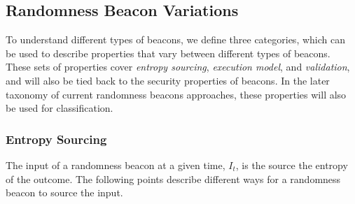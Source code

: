\subsection{Randomness Beacon Variations}
 To understand different types of beacons, we define three categories, which can be used to describe properties that vary between different types of beacons.
These sets of properties cover \emph{entropy sourcing}, \emph{execution model}, and \emph{validation}, and will also be tied back to the security properties of beacons.
In the later taxonomy of current randomness beacons approaches, these properties will also be used for classification.

\subsubsection{Entropy Sourcing}
The input of a randomness beacon at a given time, $I_t$, is the source the entropy of the outcome.
The following points describe different ways for a randomness beacon to source the input.

